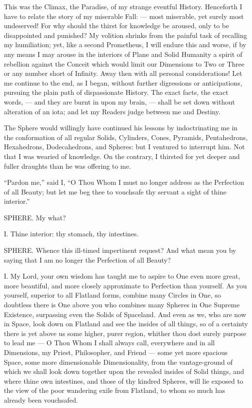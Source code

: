 \documentclass[12pt, a4paper, twoside]{memoir}
\begin{document}
This was the Climax, the Paradise, of my strange eventful History. Henceforth
I have to relate the story of my miserable Fall: --- most miserable, yet surely
most undeserved! For why should the thirst for knowledge be aroused, only to
be disappointed and punished? My volition shrinks from the painful task of
recalling my humiliation; yet, like a second Prometheus, I will endure this
and worse, if by any means I may arouse in the interiors of Plane and Solid
Humanity a spirit of rebellion against the Conceit which would limit our
Dimensions to Two or Three or any number short of Infinity. Away then with all
personal considerations! Let me continue to the end, as I began, without
further digressions or anticipations, pursuing the plain path of dispassionate
History. The exact facts, the exact words, --- and they are burnt in upon my
brain, --- shall be set down without alteration of an iota; and let my Readers
judge between me and Destiny.

The Sphere would willingly have continued his lessons by indoctrinating me in
the conformation of all regular Solids, Cylinders, Cones, Pyramids,
Pentahedrons, Hexahedrons, Dodecahedrons, and Spheres: but I ventured to
interrupt him. Not that I was wearied of knowledge.  On the contrary, I
thirsted for yet deeper and fuller draughts than he was offering to me.

``Pardon me,'' said I, ``O Thou Whom I must no longer address as the Perfection
of all Beauty; but let me beg thee to vouchsafe thy servant a sight of thine
interior.''

SPHERE. My what?

I. Thine interior: thy stomach, thy intestines.

SPHERE. Whence this ill-timed impertinent request? And what mean you by saying
that I am no longer the Perfection of all Beauty?

I. My Lord, your own wisdom has taught me to aspire to One even more great,
more beautiful, and more closely approximate to Perfection than yourself. As
you yourself, superior to all Flatland forms, combine many Circles in One, so
doubtless there is One above you who combines many Spheres in One Supreme
Existence, surpassing even the Solids of Spaceland. And even as we, who are
now in Space, look down on Flatland and see the insides of all things, so of a
certainty there is yet above us some higher, purer region, whither thou dost
surely purpose to lead me --- O Thou Whom I shall always call, everywhere and in
all Dimensions, my Priest, Philosopher, and Friend --- some yet more spacious
Space, some more dimensionable Dimensionality, from the vantage-ground of
which we shall look down together upon the revealed insides of Solid things,
and where thine own intestines, and those of thy kindred Spheres, will lie
exposed to the view of the poor wandering exile from Flatland, to whom so much
has already been vouchsafed.
\end{document}
